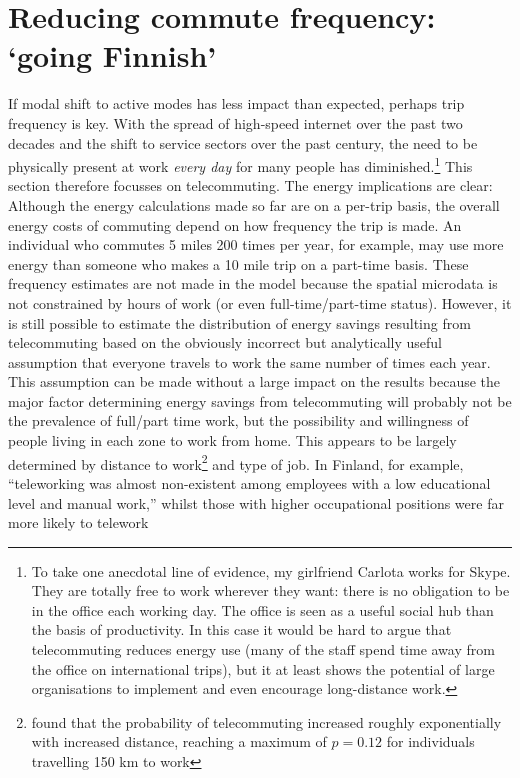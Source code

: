 \section{Reducing commute frequency: `going Finnish'}
If modal shift to active modes has less impact than expected, perhaps
trip frequency is key. With the spread of high-speed internet over the
past two decades and the shift to service sectors over the past century,
the need to be physically present at work \emph{every day} for many people
has
diminished.\footnote{To
take one anecdotal line of evidence, my girlfriend Carlota works for Skype.
They are totally free to work wherever they want: there is no obligation to
be in the office each working day. The office is seen as a useful social hub
than the basis of productivity. In this case it would be hard to argue that
telecommuting reduces energy use (many of the staff spend time away from the
office on international trips), but it at least shows the potential of large
organisations to implement and even encourage long-distance work.
}
This section therefore focusses on telecommuting. The energy implications are clear:
Although the energy calculations made so far are on a per-trip basis, the
overall energy costs of commuting depend on how frequency the trip is made.
An individual who commutes 5 miles 200 times per year, for example, may
use more energy than someone who makes a 10 mile trip on a part-time basis.
These frequency estimates are not made in the model because the spatial
microdata is not constrained by hours of work (or even full-time/part-time
status). However, it is still possible to estimate the distribution of
energy savings resulting from telecommuting based on the obviously incorrect
but analytically useful assumption that everyone travels to work the same
number of times each year. This assumption can be made without a large impact
on the results because the major factor determining energy savings from
telecommuting will probably not be the prevalence of full/part time work, but
the possibility and willingness of people living in each zone to work from home.
This appears to be largely determined by distance to
work\footnote{\citet{Helminen2007}
found that the probability of telecommuting increased roughly exponentially
with increased distance, reaching a maximum of $p=0.12$ for individuals travelling
150 km to work
}
and type of job. In Finland, for example, ``teleworking was almost non-existent
among employees with a low educational level and manual work,'' whilst those
with higher occupational positions were far more likely to telework
